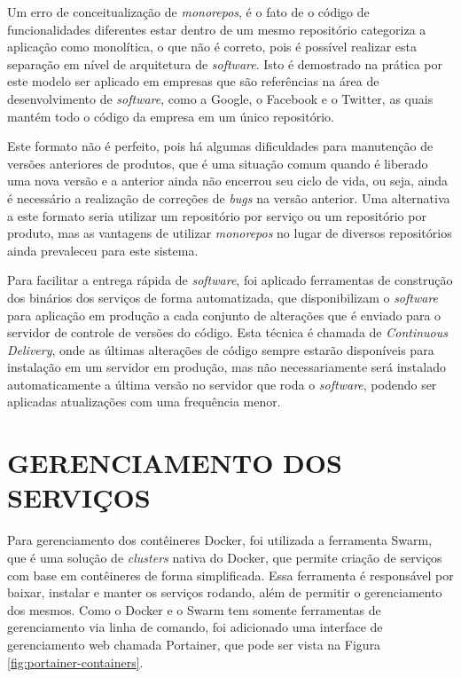 Um erro de conceitualização de \emph{monorepos}, é o fato de o código de
funcionalidades diferentes estar dentro de um mesmo repositório categoriza
a aplicação como monolítica, o que não é correto, pois é possível
realizar esta separação em nível de arquitetura de \emph{software}. Isto é
demostrado na prática por este modelo ser aplicado em empresas que são
referências na área de desenvolvimento de \emph{software}, como a Google,
o Facebook e o Twitter, as quais mantém todo o código da empresa em um
único repositório.

Este formato não é perfeito, pois há algumas dificuldades para manutenção
de versões anteriores de produtos, que é uma situação comum quando é
liberado uma nova versão e a anterior ainda não encerrou seu ciclo de vida,
ou seja, ainda é necessário a realização de correções de \emph{bugs}
na versão anterior. Uma alternativa a este formato seria utilizar um
repositório por serviço ou um repositório por produto, mas as vantagens
de utilizar \emph{monorepos} no lugar de diversos repositórios ainda
prevaleceu para este sistema.

Para facilitar a entrega rápida de \emph{software}, foi aplicado ferramentas de
construção dos binários dos serviços de forma automatizada, que disponibilizam
o \emph{software} para aplicação em produção a cada conjunto de alterações que é
enviado para o servidor de controle de versões do código. Esta técnica é
chamada de \emph{Continuous Delivery}, onde as últimas alterações de código
sempre estarão disponíveis para instalação em um servidor em produção, mas
não necessariamente será instalado automaticamente a última versão no
servidor que roda o \emph{software}, podendo ser aplicadas atualizações com uma
frequência menor.

\section{GERENCIAMENTO DOS SERVIÇOS}

Para gerenciamento dos contêineres Docker, foi utilizada a ferramenta Swarm,
que é uma solução de \emph{clusters} nativa do Docker, que permite criação de
serviços com base em contêineres de forma simplificada. Essa ferramenta é
responsável por baixar, instalar e manter os serviços rodando, além de
permitir o gerenciamento dos mesmos. Como o Docker e o Swarm tem somente
ferramentas de gerenciamento via linha de comando, foi adicionado uma
interface de gerenciamento web chamada Portainer, que pode ser vista na Figura
\ref{fig:portainer-containers}.

